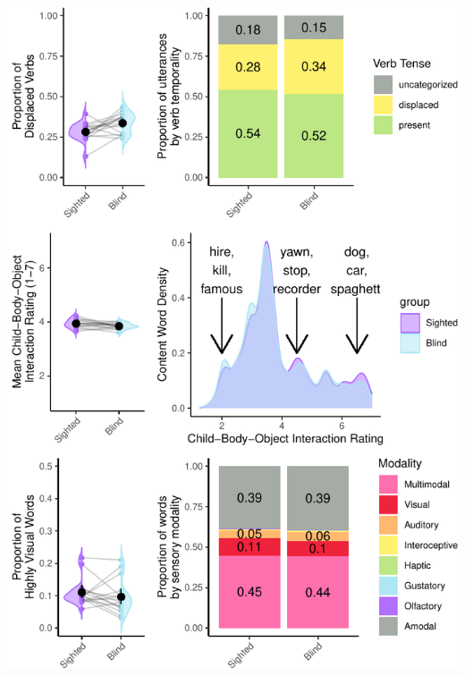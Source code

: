 \documentclass[
  man,floatsintext]{apa6}
\begin{document}
\includegraphics{input_quality_manuscript_files/figure-latex/conceptual-plots-1.pdf}
\end{document}

